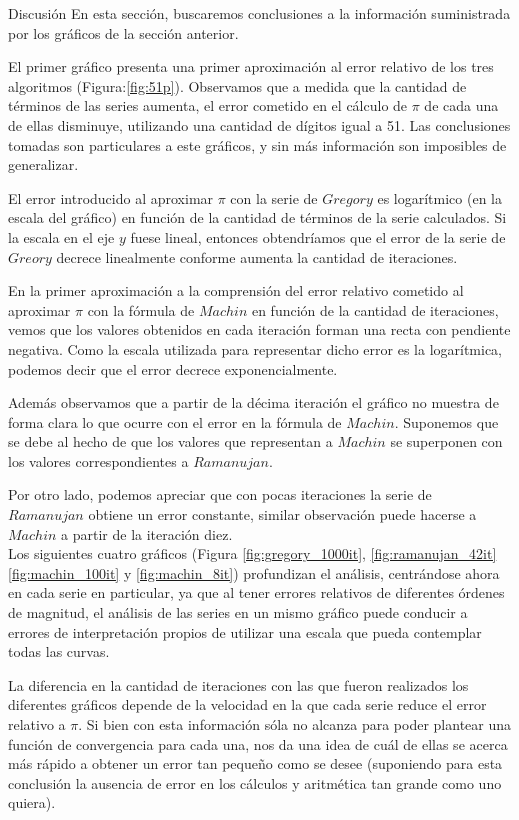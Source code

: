 \begin{section}{Discusión}
	En esta sección, buscaremos conclusiones a la información suministrada por los gráficos de la sección anterior.
	
	El primer gráfico presenta una primer aproximación al error relativo de los tres algoritmos (Figura:\ref{fig:51p}).
	Observamos que a medida que la cantidad de términos de las series aumenta, el error cometido en el cálculo de $\pi$ de cada una de ellas disminuye, utilizando una cantidad de dígitos igual a 51. Las conclusiones tomadas son particulares a este gráficos, y sin más información son imposibles de generalizar.
	
	El error introducido al aproximar $\pi$ con la serie de $Gregory$ es logarítmico (en la escala del gráfico) en función de la cantidad de términos de la serie calculados. Si la escala en el eje $y$ fuese lineal, entonces obtendríamos que el error de la serie de $Greory$ decrece linealmente conforme aumenta la cantidad de iteraciones.
	
	En la primer aproximación a la comprensión del error relativo cometido al aproximar $\pi$ con la fórmula de $Machin$ en función de la cantidad de iteraciones, vemos que los valores obtenidos en cada iteración forman una recta con pendiente negativa. Como la escala utilizada para representar dicho error es la logarítmica, podemos decir que el error decrece exponencialmente.
	
	Además observamos que a partir de la décima iteración el gráfico no muestra de forma clara lo que ocurre con el error en la fórmula de $Machin$. Suponemos que se debe al hecho de que los valores que representan a $Machin$ se superponen con los valores correspondientes a $Ramanujan$.
	
	Por otro lado, podemos apreciar que con pocas iteraciones la serie de $Ramanujan$ obtiene un error constante, similar observación puede hacerse a $Machin$ a partir de la iteración diez.\\
	
	Los siguientes cuatro gráficos (Figura \ref{fig:gregory_1000it}, \ref{fig:ramanujan_42it} \ref{fig:machin_100it} y \ref{fig:machin_8it}) profundizan el análisis, centrándose ahora en cada serie en particular, ya que al tener errores relativos de diferentes órdenes de magnitud, el análisis de las series en un mismo gráfico puede conducir a errores de interpretación propios de utilizar una escala que pueda contemplar todas las curvas.
	
	La diferencia en la cantidad de iteraciones con las que fueron realizados los diferentes gráficos depende de la velocidad en la que cada serie reduce el error relativo a $\pi$. Si bien con esta información sóla no alcanza para poder plantear una función de convergencia para cada una, nos da una idea de cuál de ellas se acerca más rápido a obtener un error tan pequeño como se desee (suponiendo para esta conclusión la ausencia de error en los cálculos y aritmética tan grande como uno quiera).
	

\end{section}
